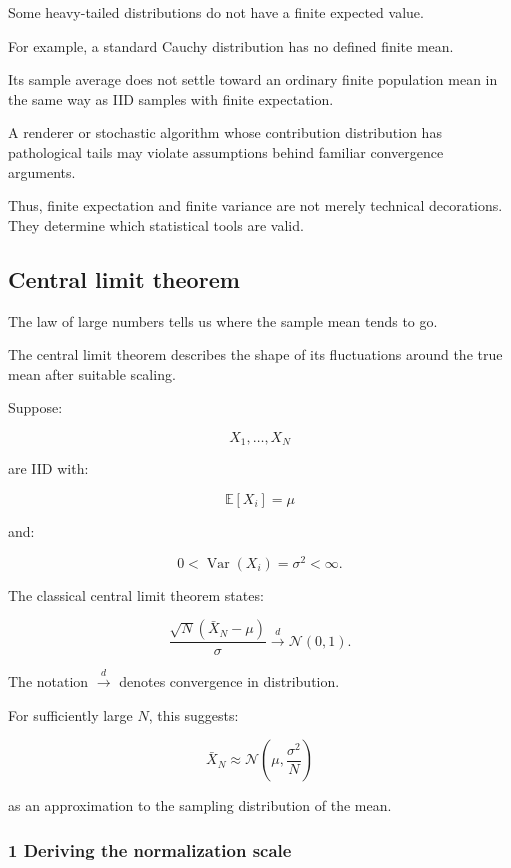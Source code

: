 \hypertarget{02-foundations-ii-ch030-when-the-mean-does-not-exist}{}

Some heavy-tailed distributions do not have a finite expected value.

For example, a standard Cauchy distribution has no defined finite mean.

Its sample average does not settle toward an ordinary finite population mean in the same way as IID samples with finite expectation.

A renderer or stochastic algorithm whose contribution distribution has pathological tails may violate assumptions behind familiar convergence arguments.

Thus, finite expectation and finite variance are not merely technical decorations. They determine which statistical tools are valid.

\subsection{Central limit theorem}\label{02-foundations-ii-ch030-central-limit-theorem}

\hypertarget{02-foundations-ii-ch030-central-limit-theorem}{}

The law of large numbers tells us where the sample mean tends to go.

The central limit theorem describes the shape of its fluctuations around the true mean after suitable scaling.

Suppose:

\[
 X_1,\ldots,X_N
\]

are IID with:

\[
 \mathbb E[X_i]=\mu
\]

and:

\[
 0<\operatorname{Var}(X_i)=\sigma^2<\infty.
\]

The classical central limit theorem states:

\[
 \boxed{ \frac{\sqrt N(\bar X_N-\mu)}{\sigma} \xrightarrow{d}\mathcal N(0,1) }.
\]

The notation \(\xrightarrow{d}\) denotes convergence in distribution.

For sufficiently large \(N\), this suggests:

\[
 \boxed{ \bar X_N \approx \mathcal N\left( \mu,\frac{\sigma^2}{N} \right) }
\]

as an approximation to the sampling distribution of the mean.

\subsubsection{1 Deriving the normalization scale}\label{02-foundations-ii-ch030-deriving-the-normalization-scale}

